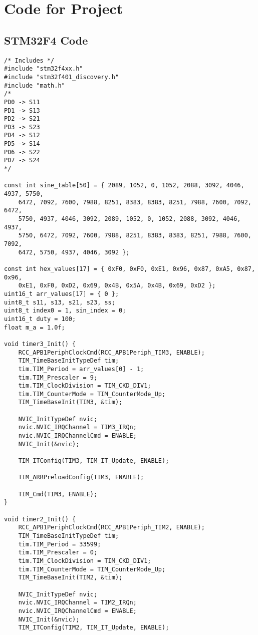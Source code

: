 
\chapter{Code for Project}
\label{AppendixA}
\section{STM32F4 Code}
\begin{lstlisting}
/* Includes */
#include "stm32f4xx.h"
#include "stm32f401_discovery.h"
#include "math.h"
/*
PD0 -> S11
PD1 -> S13
PD2 -> S21
PD3 -> S23
PD4 -> S12
PD5 -> S14
PD6 -> S22
PD7 -> S24
*/

const int sine_table[50] = { 2089, 1052, 0, 1052, 2088, 3092, 4046, 4937, 5750,
	6472, 7092, 7600, 7988, 8251, 8383, 8383, 8251, 7988, 7600, 7092, 6472,
	5750, 4937, 4046, 3092, 2089, 1052, 0, 1052, 2088, 3092, 4046, 4937,
	5750, 6472, 7092, 7600, 7988, 8251, 8383, 8383, 8251, 7988, 7600, 7092,
	6472, 5750, 4937, 4046, 3092 };

const int hex_values[17] = { 0xF0, 0xF0, 0xE1, 0x96, 0x87, 0xA5, 0x87, 0x96,
	0xE1, 0xF0, 0xD2, 0x69, 0x4B, 0x5A, 0x4B, 0x69, 0xD2 };
uint16_t arr_values[17] = { 0 };
uint8_t s11, s13, s21, s23, ss;
uint8_t index0 = 1, sin_index = 0;
uint16_t duty = 100;
float m_a = 1.0f;

void timer3_Init() {
	RCC_APB1PeriphClockCmd(RCC_APB1Periph_TIM3, ENABLE);
	TIM_TimeBaseInitTypeDef tim;
	tim.TIM_Period = arr_values[0] - 1;
	tim.TIM_Prescaler = 9;
	tim.TIM_ClockDivision = TIM_CKD_DIV1;
	tim.TIM_CounterMode = TIM_CounterMode_Up;
	TIM_TimeBaseInit(TIM3, &tim);
	
	NVIC_InitTypeDef nvic;
	nvic.NVIC_IRQChannel = TIM3_IRQn;
	nvic.NVIC_IRQChannelCmd = ENABLE;
	NVIC_Init(&nvic);
	
	TIM_ITConfig(TIM3, TIM_IT_Update, ENABLE);
	
	TIM_ARRPreloadConfig(TIM3, ENABLE);
	
	TIM_Cmd(TIM3, ENABLE);
}

void timer2_Init() {
	RCC_APB1PeriphClockCmd(RCC_APB1Periph_TIM2, ENABLE);
	TIM_TimeBaseInitTypeDef tim;
	tim.TIM_Period = 33599;
	tim.TIM_Prescaler = 0;
	tim.TIM_ClockDivision = TIM_CKD_DIV1;
	tim.TIM_CounterMode = TIM_CounterMode_Up;
	TIM_TimeBaseInit(TIM2, &tim);
	
	NVIC_InitTypeDef nvic;
	nvic.NVIC_IRQChannel = TIM2_IRQn;
	nvic.NVIC_IRQChannelCmd = ENABLE;
	NVIC_Init(&nvic);
	TIM_ITConfig(TIM2, TIM_IT_Update, ENABLE);
	

\end{lstlisting}
